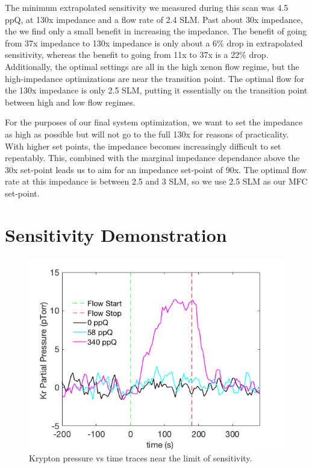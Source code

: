 \documentclass[12pt]{article}
\begin{document}
The minimum extrapolated sensitivity we measured during this scan was 4.5 ppQ, at 130x impedance and a flow rate of 2.4 SLM. Past about 30x impedance, the we find only a small benefit in increasing the impedance. The benefit of going from 37x impedance to 130x impedance is only about a 6\% drop in extrapolated sensitivity, whereas the benefit to going from 11x to 37x is a 22\% drop. Additionally, the optimal settings are all in the high xenon flow regime, but the high-impedance optimizations are near the transition point. The optimal flow for the 130x impedance is only 2.5 SLM, putting it essentially on the transition point between high and low flow regimes.

For the purposes of our final system optimization, we want to set the impedance as high as possible but will not go to the full 130x for reasons of practicality. With higher set points, the impedance becomes increasingly difficult to set repeatably. This, combined with the marginal impedance dependance above the 30x  set-point leads us to aim for an impedance set-point of 90x. The optimal flow rate at this impedance is between 2.5 and 3 SLM, so we use 2.5 SLM as our MFC set-point.


\section{Sensitivity Demonstration}



\begin{figure}[h]
  \includegraphics[width=\linewidth]{Figures/SLAC_PvT_ppq_sensitivity.png}
  \caption{Krypton pressure vs time traces near the limit of sensitivity.}
  \label{fig:senstrace}
\end{figure}
\end{document}
